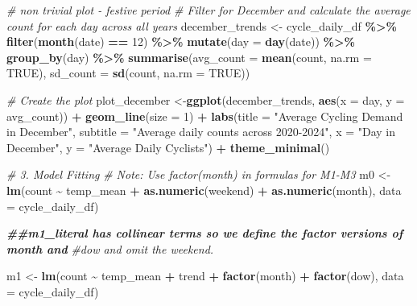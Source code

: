 \documentclass[
]{article}
\newenvironment{Shaded}{\begin{snugshade}}{\end{snugshade}}
\newcommand{\AttributeTok}[1]{\textcolor[rgb]{0.13,0.29,0.53}{#1}}
\newcommand{\CommentTok}[1]{\textcolor[rgb]{0.56,0.35,0.01}{\textit{#1}}}
\newcommand{\ConstantTok}[1]{\textcolor[rgb]{0.56,0.35,0.01}{#1}}
\newcommand{\DecValTok}[1]{\textcolor[rgb]{0.00,0.00,0.81}{#1}}
\newcommand{\DocumentationTok}[1]{\textcolor[rgb]{0.56,0.35,0.01}{\textbf{\textit{#1}}}}
\newcommand{\FunctionTok}[1]{\textcolor[rgb]{0.13,0.29,0.53}{\textbf{#1}}}
\newcommand{\NormalTok}[1]{#1}
\newcommand{\OtherTok}[1]{\textcolor[rgb]{0.56,0.35,0.01}{#1}}
\newcommand{\SpecialCharTok}[1]{\textcolor[rgb]{0.81,0.36,0.00}{\textbf{#1}}}
\newcommand{\StringTok}[1]{\textcolor[rgb]{0.31,0.60,0.02}{#1}}
\begin{document}
\begin{Shaded}
\begin{Highlighting}[]
\CommentTok{\# non trivial plot {-} festive period}
\CommentTok{\# Filter for December and calculate the average count for each day across all years}
\NormalTok{december\_trends }\OtherTok{\textless{}{-}}\NormalTok{ cycle\_daily\_df }\SpecialCharTok{\%\textgreater{}\%}
  \FunctionTok{filter}\NormalTok{(}\FunctionTok{month}\NormalTok{(date) }\SpecialCharTok{==} \DecValTok{12}\NormalTok{) }\SpecialCharTok{\%\textgreater{}\%}
  \FunctionTok{mutate}\NormalTok{(}\AttributeTok{day =} \FunctionTok{day}\NormalTok{(date)) }\SpecialCharTok{\%\textgreater{}\%}
  \FunctionTok{group\_by}\NormalTok{(day) }\SpecialCharTok{\%\textgreater{}\%}
  \FunctionTok{summarise}\NormalTok{(}\AttributeTok{avg\_count =} \FunctionTok{mean}\NormalTok{(count, }\AttributeTok{na.rm =} \ConstantTok{TRUE}\NormalTok{),}
            \AttributeTok{sd\_count =} \FunctionTok{sd}\NormalTok{(count, }\AttributeTok{na.rm =} \ConstantTok{TRUE}\NormalTok{))}

\CommentTok{\# Create the plot}
\NormalTok{plot\_december }\OtherTok{\textless{}{-}}\FunctionTok{ggplot}\NormalTok{(december\_trends, }\FunctionTok{aes}\NormalTok{(}\AttributeTok{x =}\NormalTok{ day, }\AttributeTok{y =}\NormalTok{ avg\_count)) }\SpecialCharTok{+}
  \FunctionTok{geom\_line}\NormalTok{(}\AttributeTok{size =} \DecValTok{1}\NormalTok{) }\SpecialCharTok{+}
  \FunctionTok{labs}\NormalTok{(}\AttributeTok{title =} \StringTok{"Average Cycling Demand in December"}\NormalTok{,}
       \AttributeTok{subtitle =} \StringTok{"Average daily counts across 2020{-}2024"}\NormalTok{,}
       \AttributeTok{x =} \StringTok{"Day in December"}\NormalTok{,}
       \AttributeTok{y =} \StringTok{"Average Daily Cyclists"}\NormalTok{) }\SpecialCharTok{+}
  \FunctionTok{theme\_minimal}\NormalTok{()}

\CommentTok{\# 3. Model Fitting}
\CommentTok{\# Note: Use factor(month) in formulas for M1{-}M3}
\NormalTok{m0 }\OtherTok{\textless{}{-}} \FunctionTok{lm}\NormalTok{(count }\SpecialCharTok{\textasciitilde{}}\NormalTok{ temp\_mean }\SpecialCharTok{+} \FunctionTok{as.numeric}\NormalTok{(weekend) }\SpecialCharTok{+} \FunctionTok{as.numeric}\NormalTok{(month), }
         \AttributeTok{data =}\NormalTok{ cycle\_daily\_df)}

\DocumentationTok{\#\#m1\_literal has collinear terms so we define the factor versions of month and }
\CommentTok{\#dow and omit the weekend.}

\NormalTok{m1 }\OtherTok{\textless{}{-}} \FunctionTok{lm}\NormalTok{(count }\SpecialCharTok{\textasciitilde{}}\NormalTok{ temp\_mean }\SpecialCharTok{+}\NormalTok{ trend }\SpecialCharTok{+} \FunctionTok{factor}\NormalTok{(month) }\SpecialCharTok{+} \FunctionTok{factor}\NormalTok{(dow), }
         \AttributeTok{data =}\NormalTok{ cycle\_daily\_df)}


\end{Highlighting}
\end{Shaded}
\end{document}
